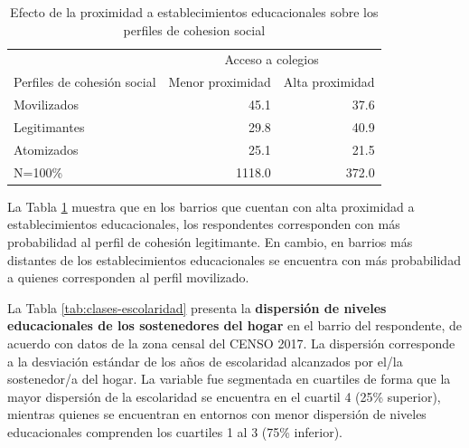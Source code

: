 \documentclass[
  12pt,
]{book}
\begin{document}
\begin{table}

\caption{\label{tab:clases-acced}Efecto de la proximidad a establecimientos educacionales sobre los perfiles de cohesion social}
\centering
\begin{tabular}[t]{l|r|r}
\hline
\multicolumn{1}{c|}{ } & \multicolumn{2}{c}{Acceso a colegios} \\
\cline{2-3}
Perfiles de cohesión social & Menor proximidad & Alta proximidad\\
\hline
Movilizados & 45.1 & 37.6\\
\hline
Legitimantes & 29.8 & 40.9\\
\hline
Atomizados & 25.1 & 21.5\\
\hline
N=100\% & 1118.0 & 372.0\\
\hline
\end{tabular}
\end{table}

La Tabla \ref{tab:clases-acced} muestra que en los barrios que cuentan con alta proximidad a establecimientos educacionales, los respondentes corresponden con más probabilidad al perfil de cohesión legitimante. En cambio, en barrios más distantes de los establecimientos educacionales se encuentra con más probabilidad a quienes corresponden al perfil movilizado.

La Tabla \ref{tab:clases-escolaridad} presenta la \textbf{dispersión de niveles educacionales de los sostenedores del hogar} en el barrio del respondente, de acuerdo con datos de la zona censal del CENSO 2017. La dispersión corresponde a la desviación estándar de los años de escolaridad alcanzados por el/la sostenedor/a del hogar. La variable fue segmentada en cuartiles de forma que la mayor dispersión de la escolaridad se encuentra en el cuartil 4 (25\% superior), mientras quienes se encuentran en entornos con menor dispersión de niveles educacionales comprenden los cuartiles 1 al 3 (75\% inferior).

\begin{table}

\caption{\label{tab:clases-escolaridad}Efecto de la dispersión de la escolaridad en el barrio sobre los perfiles de cohesion social}
\centering
{}
\end{table}
\end{document}
